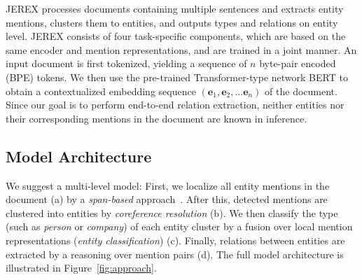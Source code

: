\documentclass[11pt,a4paper]{article}
\newcommand\name{JEREX}
\begin{document}
\name{} processes documents containing multiple sentences and extracts entity mentions, clusters them to entities, and outputs types and relations on entity level. \name{} consists of four task-specific components, which are based on the same encoder and mention representations, and are trained in a joint manner. An input document is first tokenized, yielding a sequence of $n$  byte-pair encoded (BPE) \cite{sennrich:2016:bpe} tokens. We then use the pre-trained Transformer-type network BERT \cite{devlin:2018:bert} to obtain a contextualized embedding sequence $(\mathbf{e}_1, \mathbf{e}_2, ... \mathbf{e}_n)$ of the document. Since our goal is to perform end-to-end relation extraction, neither entities nor their corresponding mentions in the document are known in inference. 

\subsection{Model Architecture}
We suggest a multi-level model: First, we localize all entity mentions in the document (a) by a \emph{span-based} approach~\cite{lee:2017:span_coreference}. After this, detected mentions are clustered into entities by \emph{coreference resolution} (b). We then classify the type (such as \emph{person} or \emph{company}) of each entity cluster by a fusion over local mention representations (\emph{entity classification}) (c). Finally, relations between entities are extracted by a reasoning over mention pairs (d). The full model architecture is illustrated in Figure~\ref{fig:approach}.
\end{document}
